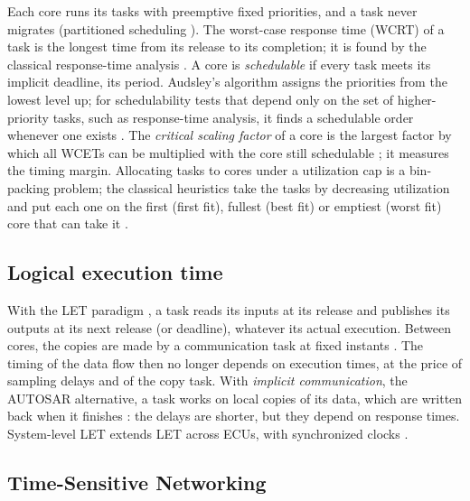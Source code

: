Each core runs its tasks with preemptive fixed priorities, and a task
never migrates (partitioned scheduling \cite{davis2011survey}). The
worst-case response time (WCRT) of a task is the longest time from its
release to its completion; it is found by the classical response-time
analysis \cite{joseph1986finding,audsley1993applying}. A core is
\emph{schedulable} if every task meets its implicit deadline, its period.
Audsley's algorithm \cite{audsley2001priority} assigns the priorities
from the lowest level up; for schedulability tests that depend only on
the set of higher-priority tasks, such as response-time analysis, it finds
a schedulable order whenever one exists \cite{davis2016review}. The \emph{critical scaling factor} of a core is the largest
factor by which all WCETs can be multiplied with the core still
schedulable \cite{lehoczky1989rate}; it measures the timing margin.
Allocating tasks to cores under a utilization cap is a bin-packing
problem; the classical heuristics take the tasks by decreasing
utilization and put each one on the first (first fit), fullest (best fit)
or emptiest (worst fit) core that can take it \cite{johnson1974fast,
davis2011survey}.

\subsection{Logical execution time}

With the LET paradigm \cite{henzinger2003giotto,kirsch2012let}, a task
reads its inputs at its release and publishes its outputs at its next
release (or deadline), whatever its actual execution. Between cores, the
copies are made by a communication task at fixed instants
\cite{hamann2017communication,biondi2018achieving}. The timing of the data
flow then no longer depends on execution times, at the price of sampling
delays and of the copy task. With \emph{implicit communication}, the
AUTOSAR alternative, a task works on local copies of its data, which are
written back when it finishes \cite{hamann2017communication}: the delays
are shorter, but they depend on response times. System-level LET extends
LET across ECUs, with synchronized clocks \cite{gemlau2021system}.

\subsection{Time-Sensitive Networking}

